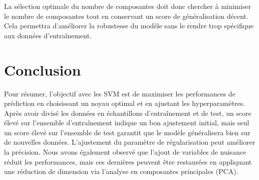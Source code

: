 \documentclass{article}
\begin{document}
La sélection optimale du nombre de composantes doit donc chercher à minimiser le nombre de composantes tout en conservant un score de généralisation décent. Cela permettra d'améliorer la robustesse du modèle sans le rendre trop spécifique aux données d'entraînement.

\section{Conclusion}
Pour résumer, l'objectif avec les SVM est de maximiser les performances de prédiction en choisissant un noyau optimal et en ajustant les hyperparamètres. Après avoir divisé les données en échantillons d'entraînement et de test, un score élevé sur l'ensemble d'entraînement indique un bon ajustement initial, mais seul un score élevé sur l'ensemble de test garantit que le modèle généralisera bien sur de nouvelles données. L'ajustement du paramètre de régularisation peut améliorer la précision. 
Nous avons également observé que l'ajout de variables de nuisance réduit les performances, mais ces dernières peuvent être restaurées en appliquant une réduction de dimension via l'analyse en composantes principales (PCA).
\end{document}
